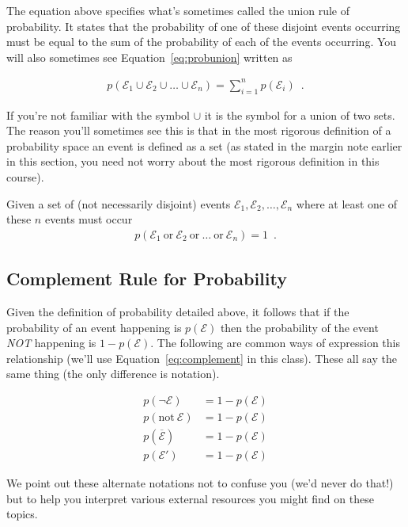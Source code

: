 \documentclass[assignment01_Solutions]{subfiles}
\begin{document}
The equation above specifies what's sometimes called the union rule of probability.  It states that the probability of one of these disjoint events occurring must be equal to the sum of the probability of each of the events occurring.  You will also sometimes see Equation~\ref{eq:probunion} written as

\begin{align}
p(\mathcal{E}_1 \cup \mathcal{E}_2 \cup \ldots \cup \mathcal{E}_n) = \sum_{i=1}^n p(\mathcal{E}_i) \enspace .
\end{align}

If you're not familiar with the symbol $\cup$ it is the symbol for a union of two sets.  The reason you'll sometimes see this is that in the most rigorous definition of a probability space an event is defined as a set (as stated in the margin note earlier in this section, you need not worry about the most rigorous definition in this course).

\item Given a set of (not necessarily disjoint) events $\mathcal{E}_1, \mathcal{E}_2, \ldots, \mathcal{E}_n$ where at least one of these $n$ events must occur
\begin{align}
p(\mathcal{E}_1~\mbox{or}~\mathcal{E}_2~\mbox{or}~\ldots~\mbox{or}~\mathcal{E}_n) = 1 \enspace .
\end{align}
\ei
\subsection{Complement Rule for Probability}

Given the definition of probability detailed above, it follows that if the probability of an event happening is $p(\mathcal{E})$ then the probability of the event \emph{NOT} happening is $1-p(\mathcal{E})$.   The following are common ways of expression this relationship (we'll use Equation~\ref{eq:complement} in this class).  These all say the same thing (the only difference is notation).

\begin{align}
p(\neg \mathcal{E}) &= 1 - p(\mathcal{E}) \label{eq:complement} \\
p(\mbox{not}~\mathcal{E}) &= 1 - p(\mathcal{E}) \nonumber \\
p(\overline{\mathcal{E}}) &= 1 - p(\mathcal{E}) \nonumber \\
p(\mathcal{E}') &= 1 - p(\mathcal{E}) \nonumber
\end{align}

We point out these alternate notations not to confuse you (we'd never do that!) but to help you interpret various external resources you might find on these topics.
\end{document}
